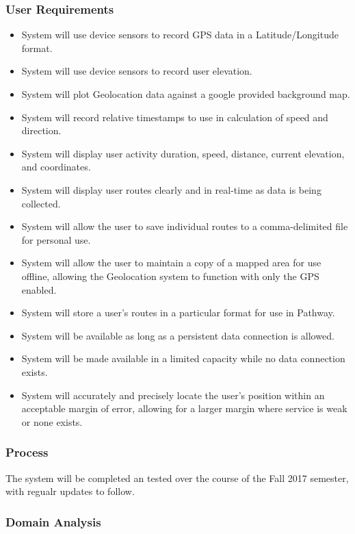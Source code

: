 ﻿\documentclass{article}
\begin{document}
\subsubsection{User Requirements}
\begin{itemize}
    \item System will use device sensors to record GPS data in a Latitude/Longitude format.
    \item System will use device sensors to record user elevation.
    \item System will plot Geolocation data against a google provided background map.
    \item System will record relative timestamps to use in calculation of speed and direction.
    \item System will display user activity duration, speed, distance, current elevation, and coordinates.
    \item System will display user routes clearly and in real-time as data is being collected.
    \item System will allow the user to save individual routes to a comma-delimited file for personal use.
    \item System will allow the user to maintain a copy of a mapped area for use offline, allowing the Geolocation system to function with only the GPS enabled.
    \item System will store a user’s routes in a particular format for use in Pathway.
    \item System will be available as long as a persistent data connection is allowed.
    \item System will be made available in a limited capacity while no data connection exists.
    \item System will accurately and precisely locate the user’s position within an acceptable margin of error, allowing for a larger margin where service is weak or none exists.
\end{itemize}

\subsubsection{Process}
The system will be completed an tested over the course of the Fall 2017 semester, with regualr updates to follow.

\subsubsection{Domain Analysis}
\end{document}
